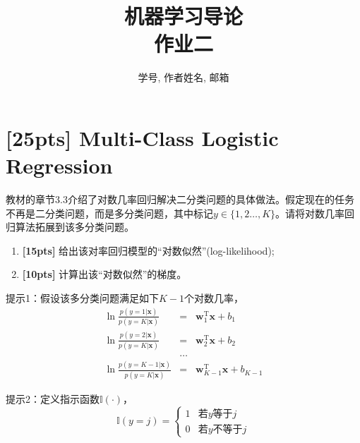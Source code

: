 \documentclass[a4paper,UTF8]{article}
\numberwithin{equation}{section}
\begin{document}
\title{机器学习导论\\
作业二}
\author{学号, 作者姓名, 邮箱}
\maketitle

\section{[25pts] Multi-Class Logistic Regression}
教材的章节3.3介绍了对数几率回归解决二分类问题的具体做法。假定现在的任务不再是二分类问题，而是多分类问题，其中标记$y\in\{1,2\dots,K\}$。请将对数几率回归算法拓展到该多分类问题。

\begin{enumerate}[(1)]
	\item \textbf{[15pts]} 给出该对率回归模型的“对数似然”(log-likelihood);
	\item \textbf{[10pts]} 计算出该“对数似然”的梯度。
\end{enumerate}

提示1：假设该多分类问题满足如下$K-1$个对数几率，
\begin{eqnarray*}
	\ln\frac{p(y=1|\mathbf{x})}{p(y=K|\mathbf{x})}&=&\mathbf{w}_1^\mathrm{T}\mathbf{x}+b_1\\
	\ln\frac{p(y=2|\mathbf{x})}{p(y=K|\mathbf{x})}&=&\mathbf{w}_2^\mathrm{T}\mathbf{x}+b_2\\
	&\dots&\\
	\ln\frac{p(y={K-1}|\mathbf{x})}{p(y=K|\mathbf{x})}&=&\mathbf{w}_{K-1}^\mathrm{T}\mathbf{x}+b_{K-1}
\end{eqnarray*}

提示2：定义指示函数$\mathbb{I}(\cdot)$，
$$\mathbb{I}(y=j)=
\begin{cases}
1& \text{若$y$等于$j$}\\
0& \text{若$y$不等于$j$}
\end{cases}$$
\end{document}
